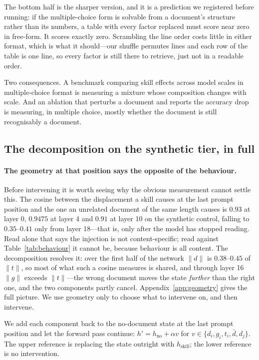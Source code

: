 \documentclass{article}
\newcommand{\dvec}{\ensuremath{d}}
\newcommand{\gvec}{\ensuremath{g}}
\newcommand{\tvec}{\ensuremath{t}}
\begin{document}
The bottom half is the sharper version, and it is a prediction we registered
before running: if the multiple-choice form is solvable from a document's
structure rather than its numbers, a table with every factor replaced must score
near zero in free-form. It scores exactly zero. Scrambling the line order costs
little in either format, which is what it should---our shuffle permutes lines and
each row of the table is one line, so every factor is still there to retrieve,
just not in a readable order.

Two consequences. A benchmark comparing skill effects across model scales in
multiple-choice format is measuring a mixture whose composition changes with
scale. And an ablation that perturbs a document and reports the accuracy drop is
measuring, in multiple choice, mostly whether the document is still recognisably
a document.

\subsection{The decomposition on the synthetic tier, in full}
\label{app:decomp}

\paragraph{The geometry at that position says the opposite of the behaviour.}
Before intervening it is worth seeing why the obvious measurement cannot settle
this. The cosine between the displacement a skill causes at the last prompt
position and the one an unrelated document of the same length causes is $0.93$ at
layer 0, $0.9475$ at layer 4 and $0.91$ at layer 10 on the synthetic control,
falling to $0.35$--$0.41$ only from layer 18---that is, only after the model has
stopped reading. Read alone that says the injection is not content-specific;
read against Table~\ref{tab:behaviour} it cannot be, because behaviour is all
content. The decomposition resolves it: over the first half of the network
$\|\dvec\|$ is $0.38$--$0.45$ of $\|\tvec\|$, so most of what such a cosine
measures is shared, and through layer 16 $\|\gvec\|$ exceeds $\|\tvec\|$---the
wrong document moves the state \emph{further} than the right one, and the two
components partly cancel. Appendix~\ref{app:geometry} gives the full picture. We
use geometry only to choose what to intervene on, and then intervene.


We add each component back to the no-document state at the last prompt position
and let the forward pass continue: $h' = h_{\text{no}} + \alpha v$ for
$v \in \{\dvec_i, \gvec_i, \tvec_i, \bar{\dvec}, \dvec_j\}$. The upper reference
is replacing the state outright with $h_{\text{skill}}$; the lower reference is
no intervention.
\end{document}
